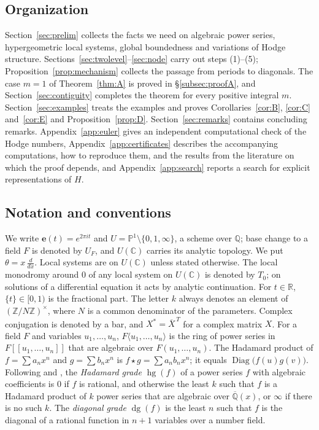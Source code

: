 \documentclass[11pt]{amsart}
\theoremstyle{definition}
\theoremstyle{remark}
\numberwithin{equation}{section}
\newcommand{\Q}{\mathbb{Q}}
\newcommand{\Z}{\mathbb{Z}}
\newcommand{\C}{\mathbb{C}}
\newcommand{\R}{\mathbb{R}}
\newcommand{\Qb}{\overline{\mathbb{Q}}}
\newcommand{\PP}{\mathbb{P}}
\newcommand{\e}{\mathbf{e}}
\newcommand{\alg}[2]{#1\langle #2\rangle}
\DeclareMathOperator{\Diag}{Diag}
\DeclareMathOperator{\hg}{hg}
\DeclareMathOperator{\dg}{dg}
\begin{document}
\subsection{Organization}
Section~\ref{sec:prelim} collects the facts we need on algebraic power series, hypergeometric local systems, global boundedness and variations of Hodge structure. Sections~\ref{sec:twolevel}--\ref{sec:node} carry out steps (1)--(5); Proposition~\ref{prop:mechanism} collects the passage from periods to diagonals. The case $m=1$ of Theorem~\ref{thm:A} is proved in \S\ref{subsec:proofA}, and Section~\ref{sec:contiguity} completes the theorem for every positive integral $m$. Section~\ref{sec:examples} treats the examples and proves Corollaries~\ref{cor:B}, \ref{cor:C} and~\ref{cor:E} and Proposition~\ref{prop:D}. Section~\ref{sec:remarks} contains concluding remarks. Appendix~\ref{app:euler} gives an independent computational check of the Hodge numbers, Appendix~\ref{app:certificates} describes the accompanying computations, how to reproduce them, and the results from the literature on which the proof depends, and Appendix~\ref{app:search} reports a search for explicit representations of $H$.

\subsection*{Notation and conventions}
We write $\e(t)=e^{2\pi it}$ and $U=\PP^1\setminus\{0,1,\infty\}$, a scheme over $\Q$; base change to a field $F$ is denoted by $U_F$, and $U(\C)$ carries its analytic topology. We put $\theta=x\,\frac{d}{dx}$. Local systems are on $U(\C)$ unless stated otherwise. The local monodromy around $0$ of any local system on $U(\C)$ is denoted by $T_0$; on solutions of a differential equation it acts by analytic continuation. For $t\in\R$, $\{t\}\in[0,1)$ is the fractional part. The letter $k$ always denotes an element of $(\Z/N\Z)^\times$, where $N$ is a common denominator of the parameters. Complex conjugation is denoted by a bar, and $X^*=\overline X^{\,T}$ for a complex matrix $X$. For a field $F$ and variables $u_1,\dots,u_n$, $\alg F{u_1,\dots,u_n}$ is the ring of power series in $F[[u_1,\dots,u_n]]$ that are algebraic over $F(u_1,\dots,u_n)$. The Hadamard product of $f=\sum a_nx^n$ and $g=\sum b_nx^n$ is $f\star g=\sum a_nb_nx^n$; it equals $\Diag\big(f(u)g(v)\big)$. Following \citet{AlloucheMendesFrance2011} and \citet{HarderKramerMiller2025}, the \emph{Hadamard grade} $\hg(f)$ of a power series $f$ with algebraic coefficients is $0$ if $f$ is rational, and otherwise the least $k$ such that $f$ is a Hadamard product of $k$ power series that are algebraic over $\Qb(x)$, or $\infty$ if there is no such $k$. The \emph{diagonal grade} $\dg(f)$ is the least $n$ such that $f$ is the diagonal of a rational function in $n+1$ variables over a number field.
\end{document}
